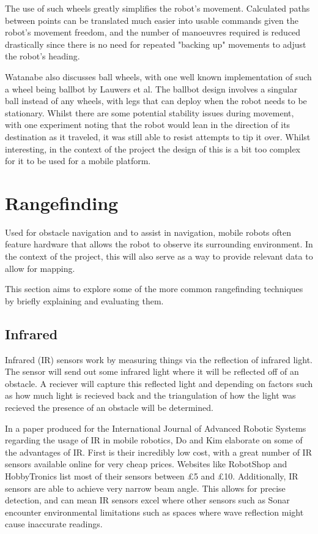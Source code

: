 			The use of such wheels greatly simplifies the robot's movement. Calculated paths between points can be translated much easier into usable commands given the robot's movement freedom, and the number of manoeuvres required is reduced drastically since there is no need for repeated "backing up" movements to adjust the robot's heading.
			
			Watanabe also discusses ball wheels, with one well known implementation of such a wheel being ballbot by Lauwers et al\citep{lauwers2006dynamically}. The ballbot design involves a singular ball instead of any wheels, with legs that can deploy when the robot needs to be stationary. Whilst there are some potential stability issues during movement, with one experiment noting that the robot would lean in the direction of its destination as it traveled, it was still able to resist attempts to tip it over. Whilst interesting, in the context of the project the design of this is a bit too complex for it to be used for a mobile platform.
			
			\section{Rangefinding}
			\label{litreview:rangefinding}
			Used for obstacle navigation and to assist in navigation, mobile robots often feature hardware that allows the robot to observe its surrounding environment. In the context of the project, this will also serve as a way to provide relevant data to allow for mapping. 

			This section aims to explore some of the more common rangefinding techniques by briefly explaining and evaluating them.
			
				\subsection{Infrared}
				\label{litreview:infrared}
				Infrared (IR) sensors work by measuring things via the reflection of infrared light. The sensor will send out some infrared light where it will be reflected off of an obstacle. A reciever will capture this reflected light and depending on factors such as how much light is recieved back and the triangulation of how the light was recieved the presence of an obstacle will be determined. 
				
				In a paper produced for the International Journal of Advanced Robotic Systems regarding the usage of IR in mobile robotics, Do and Kim\citep{do2013infrared} elaborate on some of the advantages of IR. First is their incredibly low cost, with a great number of IR sensors available online for very cheap prices. Websites like RobotShop and HobbyTronics list most of their sensors between \pounds{5} and \pounds{10}. Additionally, IR sensors are able to achieve very narrow beam angle. This allows for precise detection, and can mean IR sensors excel where other sensors such as Sonar encounter environmental limitations such as spaces where wave reflection might cause inaccurate readings. 
				
